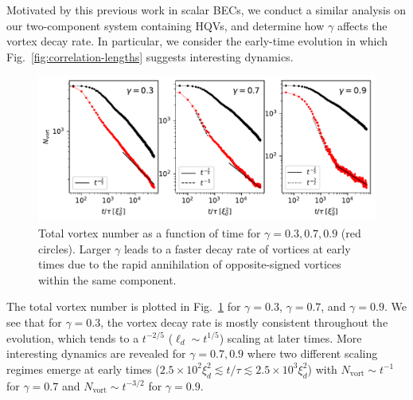 Motivated by this previous work in scalar BECs, we conduct a similar analysis
on our two-component system containing HQVs, and determine how \(\gamma \)
affects the vortex decay rate.
In particular, we consider the early-time evolution in which
Fig.~\ref{fig:correlation-lengths} suggests interesting dynamics.
\begin{figure}
    \centering
    \includegraphics[width=\textwidth]{gfx/ch-twoCompDynamics/vortex_number.pdf}
    \caption{Total vortex number as a function of time for
    \(\gamma=0.3,0.7,0.9\) (red circles).
    Larger \(\gamma \) leads to a faster decay rate of vortices at
    early times due to the rapid annihilation of opposite-signed vortices
    within the same component.\label{fig:vortex-number}}
\end{figure}
The total vortex number is plotted in Fig.~\ref{fig:vortex-number} for
\(\gamma=0.3\), \(\gamma=0.7\), and \(\gamma=0.9\).
We see that for \(\gamma=0.3\), the vortex decay rate is mostly consistent
throughout the evolution, which tends to a \(t^{-2/5}\)
(\(\ell_d \sim t^{1/5}\)) scaling at later times.
More interesting dynamics are revealed for \(\gamma=0.7, 0.9\) where two
different scaling regimes emerge at early times
(\(2.5\times10^2\xi_d^2 \lesssim t/\tau \lesssim 2.5\times10^3\xi_d^2\)) with
\(N_\mathrm{vort} \sim t^{-1}\) for \(\gamma=0.7\) and
\(N_\mathrm{vort} \sim t^{-3/2}\) for \(\gamma=0.9\).

